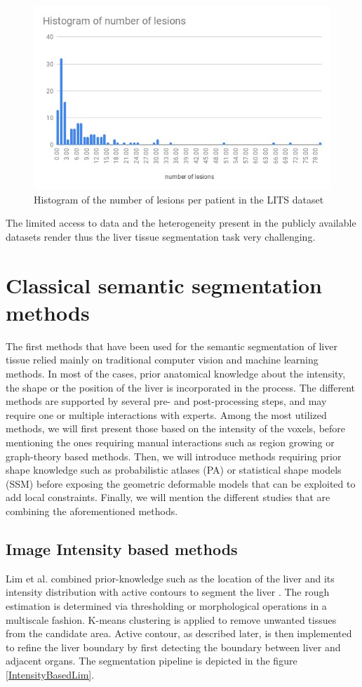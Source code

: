 \documentclass[]{article}
\begin{document}
	\begin{figure}[!ht]
		\centering
		\includegraphics[width=0.5\linewidth]{images/image11}
		\caption{Histogram of the number of lesions per patient in the LITS dataset}
		\label{NumberOfLesionsLits}
	\end{figure}
	The limited access to data and the heterogeneity present in the publicly
	available datasets render thus the liver tissue segmentation task very
	challenging.
	
	\section*{Classical semantic segmentation methods}
	
	The first methods that have been used for the semantic segmentation of
	liver tissue relied mainly on traditional computer vision and machine
	learning methods. In most of the cases, prior anatomical knowledge about
	the intensity, the shape or the position of the liver is incorporated in
	the process. The different methods are supported by several pre- and
	post-processing steps, and may require one or multiple interactions with
	experts.
	Among the most utilized methods, we will first present those based on
	the intensity of the voxels, before mentioning the ones requiring manual
	interactions such as region growing or graph-theory based methods. Then,
	we will introduce methods requiring prior shape knowledge such as
	probabilistic atlases (PA) or statistical shape models (SSM) before
	exposing the geometric deformable models that can be exploited to add
	local constraints.
	Finally, we will mention the different studies that are combining the
	aforementioned methods.
	
	\subsection*{Image Intensity based methods}
	
	Lim et al. combined prior-knowledge such as the location of the liver
	and its intensity distribution with active contours to segment the
	liver \cite{Lim2004, Lim2005, Lim2006}. The rough estimation is determined via thresholding or
	morphological operations in a multiscale fashion. K-means clustering is
	applied to remove unwanted tissues from the candidate area. Active
	contour, as described later, is then implemented to refine the liver boundary by first
	detecting the boundary between liver and adjacent organs.
	The segmentation pipeline is depicted in the figure \ref{IntensityBasedLim}.
	
\end{document}
